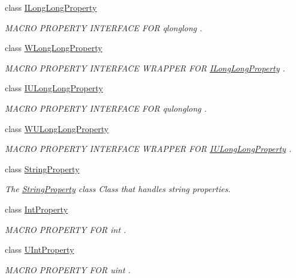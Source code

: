 \begin{DoxyCompactItemize}
class \hyperlink{class_i_long_long_property}{I\-Long\-Long\-Property}
\begin{DoxyCompactList}\small\item\em M\-A\-C\-R\-O P\-R\-O\-P\-E\-R\-T\-Y I\-N\-T\-E\-R\-F\-A\-C\-E F\-O\-R qlonglong . \end{DoxyCompactList}\item 
class \hyperlink{class_w_long_long_property}{W\-Long\-Long\-Property}
\begin{DoxyCompactList}\small\item\em M\-A\-C\-R\-O P\-R\-O\-P\-E\-R\-T\-Y I\-N\-T\-E\-R\-F\-A\-C\-E W\-R\-A\-P\-P\-E\-R F\-O\-R \hyperlink{class_i_long_long_property}{I\-Long\-Long\-Property} . \end{DoxyCompactList}\item 
class \hyperlink{class_i_u_long_long_property}{I\-U\-Long\-Long\-Property}
\begin{DoxyCompactList}\small\item\em M\-A\-C\-R\-O P\-R\-O\-P\-E\-R\-T\-Y I\-N\-T\-E\-R\-F\-A\-C\-E F\-O\-R qulonglong . \end{DoxyCompactList}\item 
class \hyperlink{class_w_u_long_long_property}{W\-U\-Long\-Long\-Property}
\begin{DoxyCompactList}\small\item\em M\-A\-C\-R\-O P\-R\-O\-P\-E\-R\-T\-Y I\-N\-T\-E\-R\-F\-A\-C\-E W\-R\-A\-P\-P\-E\-R F\-O\-R \hyperlink{class_i_u_long_long_property}{I\-U\-Long\-Long\-Property} . \end{DoxyCompactList}\item 
class \hyperlink{class_string_property}{String\-Property}
\begin{DoxyCompactList}\small\item\em The \hyperlink{class_string_property}{String\-Property} class Class that handles string properties. \end{DoxyCompactList}\item 
class \hyperlink{class_int_property}{Int\-Property}
\begin{DoxyCompactList}\small\item\em M\-A\-C\-R\-O P\-R\-O\-P\-E\-R\-T\-Y F\-O\-R int . \end{DoxyCompactList}\item 
class \hyperlink{class_u_int_property}{U\-Int\-Property}
\begin{DoxyCompactList}\small\item\em M\-A\-C\-R\-O P\-R\-O\-P\-E\-R\-T\-Y F\-O\-R uint . \end{DoxyCompactList}\item 

\end{DoxyCompactItemize}

